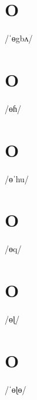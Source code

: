 \documentclass[10pt,a4paper,twoside]{book}
\begin{document}
\section*{O}

\begin{multicols}{3}
 {/ˈɵgbʌ/} {}
\end{multicols}

\section*{O}

\begin{multicols}{3}
 {/ɵɦ/} {}
\end{multicols}

\section*{O}

\begin{multicols}{3}
 {/ɵˈhu/} {}
\end{multicols}

\section*{O}

\begin{multicols}{3}
 {/ɵq/} {}
\end{multicols}

\section*{O}

\begin{multicols}{3}
 {/ɵɭ/} {}
\end{multicols}

\section*{O}

\begin{multicols}{3}
 {/ˈɵɭɵ/} {}
\end{multicols}
\end{document}
